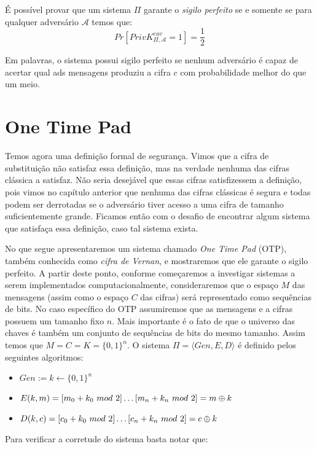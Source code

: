 É possível provar que um sistema $\Pi$ garante o {\em sigilo perfeito} se e somente se para qualquer adversário $\mathcal{A}$ temos que:
\begin{displaymath}
Pr[PrivK^{eav}_{\Pi, \mathcal{A}} = 1] = \frac{1}{2}
\end{displaymath}

Em palavras, o sistema possui sigilo perfeito se nenhum adversário é capaz de acertar qual ads mensagens produziu a cifra $c$ com probabilidade melhor do que um meio.

\section{One Time Pad}
\label{sec:otp}

Temos agora uma definição formal de segurança.
Vimos que a cifra de substituição não satisfaz essa definição, mas na verdade nenhuma das cifras clássica a satisfaz.
Não seria desejável que essas cifras satisfizessem a definição, pois vimos no capítulo anterior que nenhuma das cifras clássicas é segura e todas podem ser derrotadas se o adversário tiver acesso a uma cifra de tamanho suficientemente grande.
Ficamos então com o desafio de encontrar algum sistema que satisfaça essa definição, caso tal sistema exista.

No que segue apresentaremos um sistema chamado {\em One Time Pad} (OTP), também conhecida como {\em cifra de Vernan}, e mostraremos que ele garante o sigilo perfeito.
A partir deste ponto, conforme começaremos a investigar sistemas a serem implementados computacionalmente, consideraremos que o espaço $M$ das mensagens (assim como o espaço $C$ das cifras) será representado como sequências de bits.
No caso específico do OTP assumiremos que as mensagens e a cifras possuem um tamanho fixo $n$.
Mais importante é o fato de que o universo das chaves é também um conjunto de sequências de bits do mesmo tamanho.
Assim temos que $M = C = K = \{0,1\}^n$.
O sistema $\Pi = \langle Gen, E, D \rangle$ é definido pelos seguintes algoritmos:
\begin{itemize}
\item $Gen := k \leftarrow \{0,1\}^n$
\item $E(k,m) = [m_0 + k_0\ mod\ 2] \dots [m_n + k_n\ mod\ 2] = m \oplus k$
\item $D(k,c) = [c_0 + k_0\ mod\ 2] \dots [c_n + k_n\ mod\ 2] = c \oplus k$
\end{itemize}

Para verificar a corretude do sistema basta notar que:

